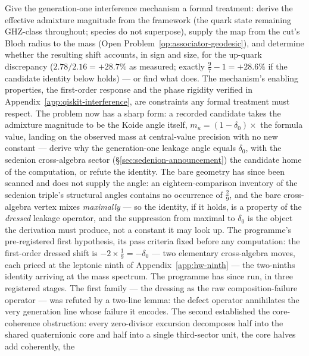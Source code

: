 \begin{openproblem}\label{op:up-quark}
Give the generation-one interference mechanism a formal treatment: derive the effective
admixture magnitude from the framework (the quark state remaining GHZ-class throughout; species
do not superpose), supply the map from the cut's Bloch radius to the mass
(Open Problem~\ref{op:associator-geodesic}), and determine whether the resulting shift accounts,
in sign and size, for the up-quark discrepancy ($2.78/2.16 = +28.7\%$ as measured; exactly
$\tfrac{9}{7} - 1 = +28.6\%$ if the candidate identity below holds) --- or find what does. The mechanism's
enabling properties, the first-order response and the phase rigidity verified in
Appendix~\ref{app:qiskit-interference}, are constraints any formal treatment must respect. The
problem now has a sharp form: a recorded candidate takes the admixture magnitude to be the Koide
angle itself, $m_u = (1 - \delta_0) \times$ the formula value, landing on the observed mass at
central-value precision with no new constant --- derive why the generation-one leakage angle
equals $\delta_0$, with the sedenion cross-algebra sector (\S\ref{sec:sedenion-announcement})
the candidate home of the computation, or refute the identity. The bare geometry has since been
scanned and does not supply the angle: an eighteen-comparison inventory of the sedenion triple's
structural angles contains no occurrence of $\tfrac29$, and the bare cross-algebra vertex mixes
\emph{maximally} --- so the identity, if it holds, is a property of the \emph{dressed} leakage
operator, and the suppression from maximal to $\delta_0$ is the object the derivation must
produce, not a constant it may look up. The programme's pre-registered first hypothesis, its pass
criteria fixed before any computation: the first-order dressed shift is
$-2 \times \tfrac19 = -\delta_0$ --- two elementary cross-algebra moves, each priced at the
leptonic ninth of Appendix~\ref{app:hw-ninth} --- the two-ninths identity arriving at the mass
spectrum.
The programme has since run, in three registered stages. The first family --- the dressing as
the raw composition-failure operator --- was refuted by a two-line lemma: the defect operator
annihilates the very generation line whose failure it encodes. The second established the
core-coherence obstruction: every zero-divisor excursion decomposes half into the shared
quaternionic core and half into a single third-sector unit, the core halves add coherently, the

\end{openproblem}
